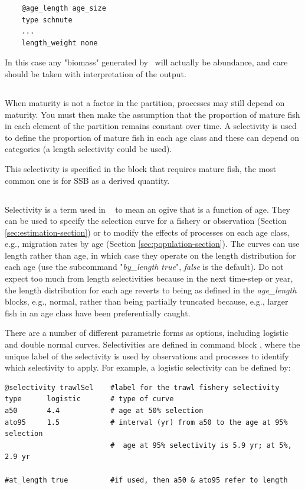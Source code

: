 {\small{\begin{verbatim}
	@age_length age_size
	type schnute
	...
	length_weight none
	\end{verbatim}}}

In this case any "biomass" generated by \CNAME~will actually be abundance, and care should be taken with interpretation of the output.

\subsection{\label{sec:maturity-notinpartition}}

When maturity is not a factor in the partition, processes may still depend on maturity. You must then make the assumption that the proportion of mature fish in each element of the partition remains constant over time. A selectivity is used to define the proportion of mature fish in each age class and these can depend on categories (a length selectivity could be used).

This selectivity is specified in the block that requires mature fish, the most common one is for SSB as a derived quantity. 

\subsection{\label{sec:selectivities}}

Selectivity is a term used in \CNAME~ to mean an ogive that is a function of age. They can be used to specify the selection curve for a fishery or observation  (Section \ref{sec:estimation-section}) or to modify the effects of processes on each age class, e.g., migration rates by age (Section \ref{sec:population-section}). The curves can use length rather than age, in which case they operate on the length distribution for each age (use the subcommand "\textit{by\_length true}", \textit{false} is the default). Do not expect too much from length selectivities because in the next time-step or year, the length distribution for each age reverts to being as defined in the \textit{age\_length} blocks, e.g., normal, rather than being partially truncated because, e.g., larger fish in an age class have been preferentially caught.

There are a number of different parametric forms as options, including logistic and double normal curves. Selectivities are defined in command block , where the unique label of the selectivity is used by observations and processes to identify which selectivity to apply. For example, a logistic selectivity can be defined by:
{\small{\begin{verbatim}
@selectivity trawlSel    #label for the trawl fishery selectivity
type      logistic       # type of curve
a50       4.4            # age at 50% selection
ato95     1.5            # interval (yr) from a50 to the age at 95% selection
                         #  age at 95% selectivity is 5.9 yr; at 5%, 2.9 yr

#at_length true          #if used, then a50 & ato95 refer to length
\end{verbatim}}}

